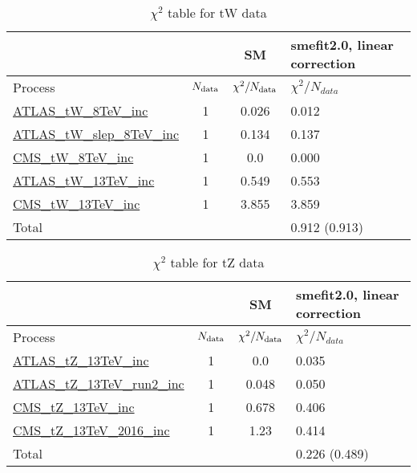 \documentclass{article}
\begin{document}
\begin{table}[H]
\centering
\begin{tabular}{|l|c|c|C{3cm}|}
\hline
  & SM& smefit2.0, linear correction\\ \hline
Process & $N_{\rm data}$ & $\chi^ 2/N_{\rm data}$& $\chi^ 2/N_{data}$\\ \hline
\href{https://arxiv.org/abs/1510.03752}{ATLAS_tW_8TeV_inc} & 1 & 0.026 & {\color{black} 0.012} \\ \hline
\href{https://arxiv.org/abs/2007.01554}{ATLAS_tW_slep_8TeV_inc} & 1 & 0.134 & {\color{black} 0.137} \\ \hline
\href{https://arxiv.org/abs/1401.2942}{CMS_tW_8TeV_inc} & 1 & 0.0 & {\color{black} 0.000} \\ \hline
\href{https://arxiv.org/abs/1612.07231}{ATLAS_tW_13TeV_inc} & 1 & 0.549 & {\color{black} 0.553} \\ \hline
\href{https://arxiv.org/abs/1805.07399}{CMS_tW_13TeV_inc} & 1 & 3.855 & {\color{black} 3.859} \\ \hline
\hline Total & &  & 0.912 (0.913) \\ \hline
\end{tabular}
\caption{$\chi^2$ table for tW data}
\end{table}
\begin{table}[H]
\centering
\begin{tabular}{|l|c|c|C{3cm}|}
\hline
  & SM& smefit2.0, linear correction\\ \hline
Process & $N_{\rm data}$ & $\chi^ 2/N_{\rm data}$& $\chi^ 2/N_{data}$\\ \hline
\href{https://arxiv.org/abs/1712.02825}{ATLAS_tZ_13TeV_inc} & 1 & 0.0 & {\color{black} 0.035} \\ \hline
\href{https://arxiv.org/abs/2002.07546}{ATLAS_tZ_13TeV_run2_inc} & 1 & 0.048 & {\color{black} 0.050} \\ \hline
\href{https://arxiv.org/abs/1712.02825}{CMS_tZ_13TeV_inc} & 1 & 0.678 & {\color{black} 0.406} \\ \hline
\href{https://arxiv.org/abs/1812.05900}{CMS_tZ_13TeV_2016_inc} & 1 & 1.23 & {\color{blue} 0.414} \\ \hline
\hline Total & &  & 0.226 (0.489) \\ \hline
\end{tabular}
\caption{$\chi^2$ table for tZ data}
\end{table}
\end{document}

